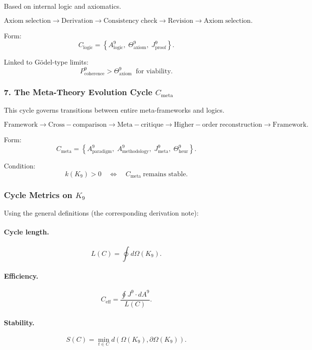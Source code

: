 Based on internal logic and axiomatics.

\[
  \mathrm{Axiom\;selection}
  \to
  \mathrm{Derivation}
  \to
  \mathrm{Consistency\;check}
  \to
  \mathrm{Revision}
  \to
  \mathrm{Axiom\;selection}.
\]

Form:
\[
 C_{\mathrm{logic}}
  =
  \left\{
    A^9_{\mathrm{logic}},\;
    \Theta^9_{\mathrm{axiom}},\;
    J^9_{\mathrm{proof}}
  \right\}.
\]

Linked to Gödel-type limits:
\[
  P^9_{\mathrm{coherence}} > \Theta^9_{\mathrm{axiom}}
  \;\;\text{for viability}.
\]


\subsubsection{7. The Meta-Theory Evolution Cycle $C_{\mathrm{meta}}$}

This cycle governs transitions between entire meta-frameworks and logics.

\[
  \mathrm{Framework}
  \to
  \mathrm{Cross\!-\!comparison}
  \to
  \mathrm{Meta\!-\!critique}
  \to
  \mathrm{Higher\!-\!order\;reconstruction}
  \to
  \mathrm{Framework}.
\]

Form:
\[
 C_{\mathrm{meta}}
 =
 \left\{
   A^9_{\mathrm{paradigm}},\;
   A^9_{\mathrm{methodology}},\;
   J^9_{\mathrm{meta}},\;
   \Theta^9_{\mathrm{heur}}
 \right\}.
\]

Condition:
\[
  k(K_9) > 0 \quad\Leftrightarrow\quad
  C_{\mathrm{meta}}\;\text{remains stable}.
\]


\subsubsection{Cycle Metrics on \texorpdfstring{$K_9$}{K_9}}

Using the general definitions (the corresponding derivation note):

\paragraph{Cycle length.}
\[
  L(C) = \oint d\Omega(K_9).
\]

\paragraph{Efficiency.}
\[
  C_{\mathrm{eff}} = 
  \frac{\oint J^9 \cdot dA^9}{L(C)}.
\]

\paragraph{Stability.}
\[
  S(C)
    = \min_{t\in C}
      d(\Omega(K_9),\partial\Omega(K_9)).
\]

